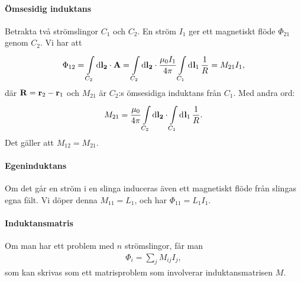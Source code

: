 \paragraph{Ömsesidig induktans}
Betrakta två strömslingor $C_{1}$ och $C_{2}$. En ström $I_{1}$ ger ett magnetiskt flöde $\Phi_{21}$ genom $C_{2}$. Vi har att
\begin{align*}
	\Phi_{12} = \int\limits_{C_{2}}^{}\dd{\vb{l_{2}}}\cdot \vb{A} = \int\limits_{C_{2}}^{}\dd{\vb{l_{2}}}\cdot \frac{\mu_{0}I_{1}}{4\pi}\int\limits_{C_{1}}^{}\dd[]{\vb{l}_{1}}\frac{1}{R} = M_{21}I_{1},
\end{align*}
där $\vb{R} = \vb{r}_{2} - \vb{r}_{1}$ och $M_{21}$ är $C_{2}$:s ömsesidiga induktans från $C_{1}$. Med andra ord:
\begin{align*}
	M_{21} = \frac{\mu_{0}}{4\pi}\int\limits_{C_{2}}^{}\dd{\vb{l_{2}}}\cdot \int\limits_{C_{1}}^{}\dd[]{\vb{l}_{1}}\frac{1}{R}.
\end{align*}
Det gäller att $M_{12} = M_{21}$.

\paragraph{Egeninduktans}
Om det går en ström i en slinga induceras även ett magnetiskt flöde från slingas egna fält. Vi döper denna $M_{11} = L_{1}$, och har $\Phi_{11} = L_{1}I_{1}$.

\paragraph{Induktansmatris}
Om man har ett problem med $n$ strömslingor, får man
\begin{align*}
	\Phi_{i} = \sum\limits_{j}M_{ij}I_{j},
\end{align*}
som kan skrivas som ett matrisproblem som involverar induktansmatrisen $M$.